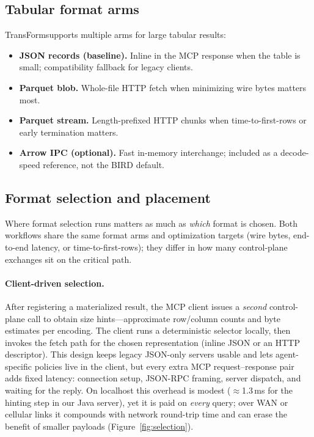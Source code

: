 \documentclass[sigconf, nonacm]{acmart}
\newcommand{\system}{TransForm}
\begin{document}
\subsection{Tabular format arms}
\system supports multiple arms for large tabular results:
\begin{itemize}
  \item \textbf{JSON records (baseline).} Inline in the MCP response when the table is small; compatibility fallback for legacy clients.
  \item \textbf{Parquet blob.} Whole-file HTTP fetch when minimizing wire bytes matters most.
  \item \textbf{Parquet stream.} Length-prefixed HTTP chunks when time-to-first-rows or early termination matters.
  \item \textbf{Arrow IPC (optional).} Fast in-memory interchange; included as a decode-speed reference, not the BIRD default.
\end{itemize}

\subsection{Format selection and placement}
\label{sec:selection}

Where format selection runs matters as much as \emph{which} format is chosen. Both workflows share the same format arms and optimization targets (wire bytes, end-to-end latency, or time-to-first-rows); they differ in how many control-plane exchanges sit on the critical path.

\paragraph{Client-driven selection.}
After registering a materialized result, the MCP client issues a \emph{second} control-plane call to obtain size hints---approximate row/column counts and byte estimates per encoding. The client runs a deterministic selector locally, then invokes the fetch path for the chosen representation (inline JSON or an HTTP descriptor). This design keeps legacy JSON-only servers usable and lets agent-specific policies live in the client, but every extra MCP request--response pair adds fixed latency: connection setup, JSON-RPC framing, server dispatch, and waiting for the reply. On localhost this overhead is modest ($\approx$1.3\,ms for the hinting step in our Java server), yet it is paid on \emph{every} query; over WAN or cellular links it compounds with network round-trip time and can erase the benefit of smaller payloads (Figure~\ref{fig:selection}).
\end{document}
